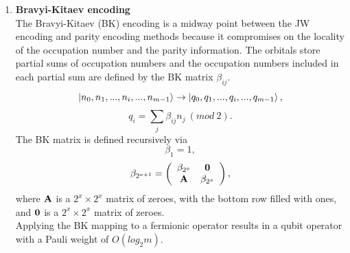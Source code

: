 \begin{enumerate}
    \item \textbf{Bravyi-Kitaev encoding} \\
    The Bravyi-Kitaev (BK) encoding is a midway point between the JW encoding and parity encoding methods because it compromises on the locality of the occupation number and the parity information. The orbitals store partial sums of occupation numbers and the occupation numbers included in each partial sum are defined by the BK matrix $\beta_{ij}$.
    \begin{equation}
        \ket{n_0,n_1,...,n_i,...,n_{m-1}} \rightarrow \ket{q_0,q_1,...,q_i,...,q_{m-1}},
    \end{equation}
    \begin{equation}
        q_i = \sum_j \beta_{ij} n_j \ (mod \ 2).
    \end{equation}
    The BK matrix is defined recursively via
    \begin{equation}
        \beta_1 = 1,
    \end{equation}
    \begin{equation}
        \beta_{2^{x+1}} = \left( \begin{array}{cc} \beta_{2^x} & \bf{0} \\
                                                   \bf{A} & \beta_{2^x} \end{array} \right),
    \end{equation}
    where $\bf{A}$ is a $2^x \times 2^x$ matrix of zeroes, with the bottom row filled with ones, and $\bf{0}$ is a $2^x \times 2^x$ matrix of zeroes. \\
    Applying the BK mapping to a fermionic operator results in a qubit operator with a Pauli weight of $O(log_2 m)$.
    

\end{enumerate}
